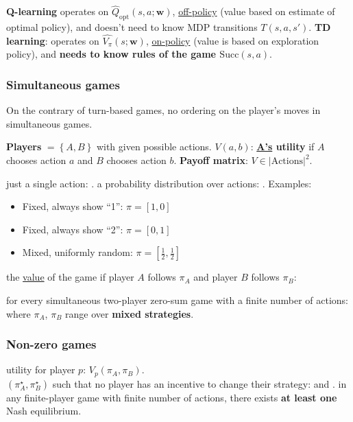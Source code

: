  \textbf{Q-learning} operates on
$\hat{Q}_{\text{opt}}(s,a;\mathbf{w})$, \underline{off-policy} (value based on
estimate of optimal policy), and doesn't need to know MDP transitions
$T(s,a,s')$. \textbf{TD learning}: operates on $\hat{V_\pi}(s;\mathbf{w})$,
\underline{on-policy} (value is based on exploration policy), and \textbf{needs
to know rules of the game $\text{Succ}(s,a)$}.

\subsubsection{Simultaneous games}

On the contrary of turn-based games, no ordering on the player's moves in
simultaneous games.

 \textbf{Players} $= \left\{A, B\right\}$
with given possible actions. \textbf{$V(a,b)$}: \textbf{\underline{A's} utility}
if $A$ chooses action $a$ and $B$ chooses action $b$. \textbf{Payoff matrix}: $V
\in |\text{Actions}|^2$.

 just a single action: .
 a probability distribution over actions:
. Examples:
\begin{itemize}
    \item Fixed, always show ``1'': $\pi = [1,0]$
    \item Fixed, always show ``2'': $\pi = [0,1]$
    \item Mixed, uniformly random: $\pi = [\frac{1}{2}, \frac{1}{2}]$
\end{itemize}

 the \underline{value} of the game if player $A$ follows
$\pi_A$ and player $B$ follows $\pi_B$:

 for every simultaneous two-player zero-sum
game with a finite number of actions:
 where
$\pi_A$, $\pi_B$ range over \textbf{mixed strategies}.

\subsubsection{Non-zero games}

 utility for player $p$: $V_p(\pi_A, \pi_B)$.\\
 $(\pi_A^\star, \pi_B^\star)$ such that no player has an
incentive to change their strategy:
 and
.
 in any finite-player game with finite number of
actions, there exists \textbf{at least one} Nash equilibrium.